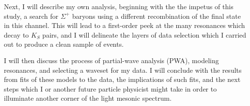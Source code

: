 Next, I will describe my own analysis, beginning with the the impetus of this study, a search for $\Sigma^+$ baryons using a different recombination of the final state in this channel. This will lead to a first-order peek at the many resonances which decay to $K_S$ pairs, and I will delineate the layers of data selection which I carried out to produce a clean sample of events.

I will then discuss the process of partial-wave analysis (PWA), modeling resonances, and selecting a waveset for my data. I will conclude with the results from fits of these models to the data, the implications of such fits, and the next steps which I or another future particle physicist might take in order to illuminate another corner of the light mesonic spectrum.

